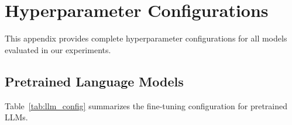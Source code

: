 
\appendix

\section{Hyperparameter Configurations}
\label{appendix:training}

This appendix provides complete hyperparameter configurations for all models evaluated in our experiments.

\subsection{Pretrained Language Models}
\label{appendix:pretrained}

Table~\ref{tab:llm_config} summarizes the fine-tuning configuration for pretrained LLMs.

